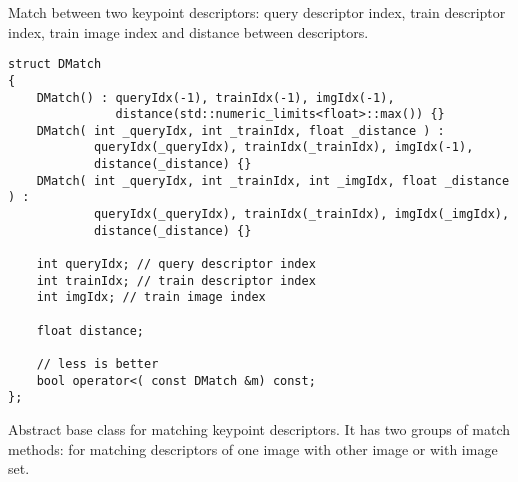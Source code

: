 Match between two keypoint descriptors: query descriptor index, 
train descriptor index, train image index and distance between descriptors.

\begin{lstlisting}
struct DMatch
{
    DMatch() : queryIdx(-1), trainIdx(-1), imgIdx(-1), 
               distance(std::numeric_limits<float>::max()) {}
    DMatch( int _queryIdx, int _trainIdx, float _distance ) :
            queryIdx(_queryIdx), trainIdx(_trainIdx), imgIdx(-1), 
            distance(_distance) {}
    DMatch( int _queryIdx, int _trainIdx, int _imgIdx, float _distance ) :
            queryIdx(_queryIdx), trainIdx(_trainIdx), imgIdx(_imgIdx), 
            distance(_distance) {}

    int queryIdx; // query descriptor index
    int trainIdx; // train descriptor index
    int imgIdx; // train image index

    float distance;

    // less is better
    bool operator<( const DMatch &m) const;
};
\end{lstlisting}

Abstract base class for matching keypoint descriptors. It has two groups 
of match methods: for matching descriptors of one image with other image or
with image set.

